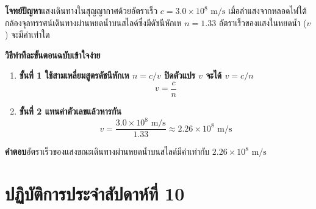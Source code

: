 \vspace{4pt}


\begin{worked}
\textbf{โจทย์ปัญหา}\quad แสงเดินทางในสุญญากาศด้วยอัตราเร็ว $c = 3.0 \times 10^8\text{ m/s}$ เมื่อลำแสงจากหลอดไฟใต้กล้องจุลทรรศน์เดินทางผ่านหยดน้ำบนสไลด์ซึ่งมีดัชนีหักเห $n = 1.33$ อัตราเร็วของแสงในหยดน้ำ ($v$) จะมีค่าเท่าใด

\textbf{วิธีทำทีละขั้นตอนฉบับเข้าใจง่าย}
\begin{enumerate}
    \item \textbf{ขั้นที่ 1 ใช้สามเหลี่ยมสูตรดัชนีหักเห $n = c / v$ ปิดตัวแปร $v$ จะได้ $v = c / n$}
    \[
        v = \frac{c}{n}
    \]
    \item \textbf{ขั้นที่ 2 แทนค่าตัวเลขแล้วหารกัน}
    \[
        v = \frac{3.0 \times 10^8\text{ m/s}}{1.33} \approx 2.26 \times 10^8\text{ m/s}
    \]
\end{enumerate}
\textbf{คำตอบ}\quad อัตราเร็วของแสงขณะเดินทางผ่านหยดน้ำบนสไลด์มีค่าเท่ากับ $2.26 \times 10^8\text{ m/s}$
\end{worked}

\section{ปฏิบัติการประจำสัปดาห์ที่ 10}


